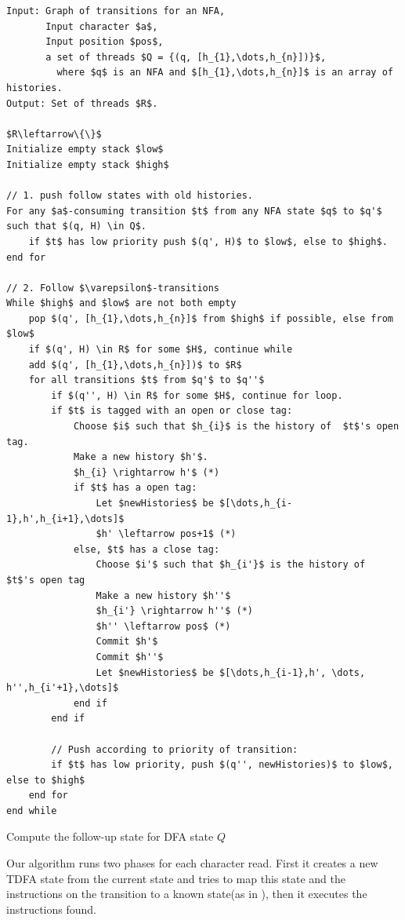 \documentclass[english]{sigplanconf}
\theoremstyle{definition}
\begin{document}
\begin{algorithm*}[H]
\begin{lstlisting}[mathescape,tabsize=2]
Input: Graph of transitions for an NFA,
	   Input character $a$,
	   Input position $pos$,
	   a set of threads $Q = {(q, [h_{1},\dots,h_{n}])}$,
	     where $q$ is an NFA and $[h_{1},\dots,h_{n}]$ is an array of histories.
Output: Set of threads $R$.

$R\leftarrow\{\}$
Initialize empty stack $low$
Initialize empty stack $high$

// 1. push follow states with old histories.
For any $a$-consuming transition $t$ from any NFA state $q$ to $q'$ such that $(q, H) \in Q$.
	if $t$ has low priority push $(q', H)$ to $low$, else to $high$.
end for

// 2. Follow $\varepsilon$-transitions
While $high$ and $low$ are not both empty
	pop $(q', [h_{1},\dots,h_{n}]$ from $high$ if possible, else from $low$
	if $(q', H) \in R$ for some $H$, continue while
	add $(q', [h_{1},\dots,h_{n}])$ to $R$
	for all transitions $t$ from $q'$ to $q''$
		if $(q'', H) \in R$ for some $H$, continue for loop.
		if $t$ is tagged with an open or close tag:
			Choose $i$ such that $h_{i}$ is the history of  $t$'s open tag.
			Make a new history $h'$.
			$h_{i} \rightarrow h'$ (*)
			if $t$ has a open tag:
				Let $newHistories$ be $[\dots,h_{i-1},h',h_{i+1},\dots]$
				$h' \leftarrow pos+1$ (*)
			else, $t$ has a close tag:
				Choose $i'$ such that $h_{i'}$ is the history of  $t$'s open tag
				Make a new history $h''$
				$h_{i'} \rightarrow h''$ (*)
				$h'' \leftarrow pos$ (*)
				Commit $h'$
				Commit $h''$
				Let $newHistories$ be $[\dots,h_{i-1},h', \dots, h'',h_{i'+1},\dots]$
			end if
		end if				
				
		// Push according to priority of transition:
		if $t$ has low priority, push $(q'', newHistories)$ to $low$, else to $high$
	end for
end while
\end{lstlisting}

\caption{\label{onestep} Compute the follow-up state for DFA state $Q$}
\end{algorithm*}





Our algorithm runs two phases for each character read. First it creates
a new TDFA state from the current state and tries to map this state
and the instructions on the transition to a known state(as in \cite{laurikari2000nfas}),
then it executes the instructions found.
\end{document}

